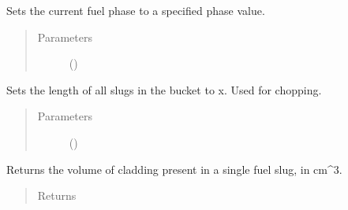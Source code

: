 \documentclass[letterpaper,10pt,openany,oneside,english]{sphinxmanual}
\begin{document}
\begin{fulllineitems}
\begin{fulllineitems}
\label{\detokenize{support_rst/fuel_bucket:fuel_bucket.FuelBucket.set_fuel_phase}}
Sets the current fuel phase to a specified phase value.
\begin{quote}\begin{description}
\item[{Parameters}] \leavevmode
{} () \textendash{} 

\end{description}\end{quote}

\end{fulllineitems}


\begin{fulllineitems}
\label{\detokenize{support_rst/fuel_bucket:fuel_bucket.FuelBucket.set_slug_length}}
Sets the length of all slugs in the bucket to x. Used for chopping.
\begin{quote}\begin{description}
\item[{Parameters}] \leavevmode
{} () \textendash{} 

\end{description}\end{quote}

\end{fulllineitems}


\begin{fulllineitems}
\label{\detokenize{support_rst/fuel_bucket:fuel_bucket.FuelBucket.slug_cladding_volume}}
Returns the volume of cladding present in a single fuel slug, in cm\textasciicircum{}3.
\begin{quote}\begin{description}
\item[{Returns}] \leavevmode
{}


\end{description}
\end{quote}
\end{fulllineitems}
\end{fulllineitems}
\end{document}
